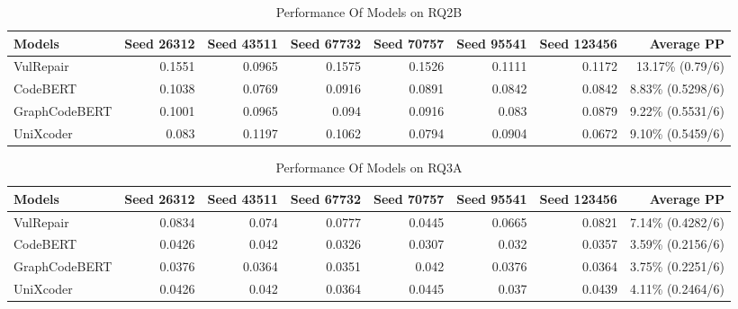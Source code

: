 \begin{table}[H]
\centering
  \caption{Performance Of Models on RQ2B}
  \label{Appendices:RQ2B}
  \begin{tabular}{|l|r|r|r|r|r|r|r|}
    \hline
    Models          & Seed 26312 & Seed 43511 & Seed 67732 & Seed 70757 & Seed 95541 & Seed 123456 & Average PP\\
    \hline
    VulRepair       & 0.1551  & 0.0965 & 0.1575 & 0.1526 & 0.1111 & 0.1172 & 13.17\% (0.79/6)\\
    \hline
    CodeBERT        & 0.1038  & 0.0769 & 0.0916 & 0.0891 & 0.0842 & 0.0842 & 8.83\% (0.5298/6)\\
    \hline
    GraphCodeBERT   & 0.1001  & 0.0965 & 0.094  & 0.0916 & 0.083  & 0.0879 & 9.22\% (0.5531/6)\\
    \hline
    UniXcoder       & 0.083   & 0.1197 & 0.1062 & 0.0794 & 0.0904 & 0.0672 & 9.10\% (0.5459/6)\\
    \hline
  \end{tabular}
\end{table}
%
%
%
\begin{table}[H]
\centering
  \caption{Performance Of Models on RQ3A}
  \label{Appendices:RQ3A}
  \begin{tabular}{|l|r|r|r|r|r|r|r|}
    \hline
    Models          & Seed 26312 & Seed 43511 & Seed 67732 & Seed 70757 & Seed 95541 & Seed 123456 & Average PP\\
    \hline
    VulRepair       & 0.0834  & 0.074  & 0.0777  & 0.0445  & 0.0665  & 0.0821   & 7.14\% (0.4282/6)\\
    \hline
    CodeBERT        & 0.0426  & 0.042  & 0.0326  & 0.0307  & 0.032   & 0.0357   & 3.59\% (0.2156/6)\\
    \hline
    GraphCodeBERT   & 0.0376  & 0.0364 & 0.0351  & 0.042   & 0.0376  & 0.0364   & 3.75\% (0.2251/6)\\
    \hline
    UniXcoder       & 0.0426  & 0.042  & 0.0364  & 0.0445  & 0.037   & 0.0439   & 4.11\% (0.2464/6)\\
    \hline
  \end{tabular}
\end{table}
%
%
%
